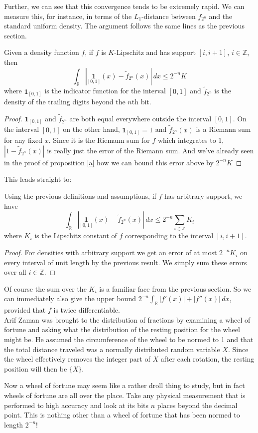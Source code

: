Further, we can see that this convergence tends to be extremely rapid. We can measure this, for instance, in terms of the $L_1$-distance between $f_{2^n}$ and the standard uniform density. The argument follows the same lines as the previous section.

\begin{proposition}
	Given a density function $f$, if $f$ is $K$-Lipschitz and has support $[i,i+1]$, $i\in\mathbb{Z}$, then
	\[
	\int_\mathbb{R} \left|\underset{[0,1]}{\mathbf{1}}(x)-\tilde{f}_{2^n}(x)\right|\,dx\leq2^{-n}K
	\]
	where $\mathbf{1}_{[0,1]}$ is the indicator function for the interval $[0,1]$ and $\tilde{f}_{2^n}$ is the density of the trailing digits beyond the $n$th bit.
\end{proposition}
\begin{proof}
$\mathbf{1}_{[0,1]}$ and $\tilde{f}_{2^n}$ are both equal everywhere outside the interval $[0,1]$. On the interval $[0,1]$ on the other hand, $\mathbf{1}_{[0,1]}=1$ and $\tilde{f}_{2^n}(x)$ is a Riemann sum for any fixed $x$. Since it is the Riemann sum for $f$ which integrates to 1, $\left|1-\tilde{f}_{2^n}(x)\right|$ is really just the error of the Riemann sum. And we've already seen in the proof of proposition \ref{a} how we can bound this error above by $2^{-n}K$
\end{proof}

This leads straight to:

\begin{proposition}
	Using the previous definitions and assumptions, if $f$ has arbitrary support, we have
	\[
	\int_\mathbb{R} \left|\underset{[0,1]}{\mathbf{1}}(x)-\tilde{f}_{2^n}(x)\right|\,dx\leq2^{-n}\sum_{i\in\mathbb{Z}}K_i
	\]
	where $K_i$ is the Lipschitz constant of $f$ corresponding to the interval $[i,i+1]$.
\end{proposition}
\begin{proof}
For densities with arbitrary support we get an error of at most $2^{-n}K_i$ on every interval of unit length by the previous result. We simply sum these errors over all $i\in\mathbb{Z}$.
\end{proof}

Of course the sum over the $K_i$ is a familiar face from the previous section. So we can immediately also give the upper bound $2^{-n}\int_\mathbb{R}|f'(x)|+|f''(x)|\,dx$, provided that $f$ is twice differentiable.\\

Arif Zaman was brought to the distribution of fractions by examining a wheel of fortune and asking what the distribution of the resting position for the wheel might be. He assumed the circumference of the wheel to be normed to 1 and that the total distance traveled was a normally distributed random variable $X$. Since the wheel effectively removes the integer part of $X$ after each rotation, the resting position will then be $\{X\}$.

Now a wheel of fortune may seem like a rather droll thing to study, but in fact wheels of fortune are all over the place. Take any physical measurement that is performed to high accuracy and look at its bits $n$ places beyond the decimal point. This is nothing other than a wheel of fortune that has been normed to length $2^{-n}$! 

